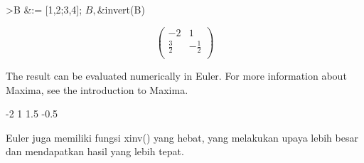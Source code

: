 \documentclass[a4paper,10pt]{article}
\begin{document}
\begin{eulernotebook}
\begin{eulercomment}
\begin{eulercomment}
\begin{eulercomment}
\begin{eulercomment}
\begin{eulercomment}
\begin{eulercomment}
\begin{eulerttcomment}
\end{eulerttcomment}
\begin{eulerprompt}
>B &:= [1,2;3,4]; $B, $&invert(B)
\end{eulerprompt}
\begin{eulerformula}
\[
\begin{pmatrix}-2 & 1 \\ \frac{3}{2} & -\frac{1}{2} \\   \end{pmatrix}
\]
\end{eulerformula}
\begin{eulercomment}
The result can be evaluated numerically in Euler. For more information
about Maxima, see the introduction to Maxima.
\end{eulercomment}
\begin{euleroutput}
             -2             1 
            1.5          -0.5 
\end{euleroutput}
\begin{eulercomment}
Euler juga memiliki fungsi xinv() yang hebat, yang melakukan upaya
lebih besar dan mendapatkan hasil yang lebih tepat.


\end{eulercomment}
\end{eulercomment}
\end{eulercomment}
\end{eulercomment}
\end{eulercomment}
\end{eulercomment}
\end{eulercomment}
\end{eulernotebook}
\end{document}
